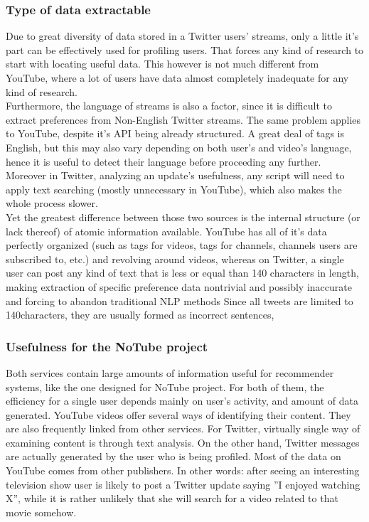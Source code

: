 \subsubsection{Type of data extractable}
Due to great diversity of data stored in a Twitter users' streams, only a little it's part can be effectively used for profiling
users. That forces any kind of research to start with locating useful data. This however is not much different from YouTube, where
a lot of users have data almost completely inadequate for any kind of research.
\\ Furthermore, the language of streams is also a factor, since it is difficult to extract preferences from Non-English Twitter
streams. The same problem applies to YouTube, despite it's API being already structured. A great deal of tags is English,
but this may also vary depending on both user's and video's language, hence it is useful to detect their language before
proceeding any further. Moreover in Twitter, analyzing an update's usefulness, any script will need to apply text searching (mostly
unnecessary in YouTube), which also makes the whole process slower.
\\ Yet the greatest difference between those two sources is the internal structure (or lack thereof) of atomic information
available. YouTube has all of it's data perfectly organized (such as tags for videos, tags for channels, channels users are
subscribed to, etc.) and revolving around videos, whereas on Twitter, a single user can post any kind of text that is
less or equal than 140 characters in length, making extraction of specific preference data nontrivial and possibly inaccurate and forcing to abandon traditional
NLP methods
Since all tweets are limited to 140characters, they are usually formed as incorrect sentences,
\subsubsection{Usefulness for the NoTube project}
Both services contain large amounts of information useful for recommender
systems, like the one designed for NoTube project. For both of them, the
efficiency for a single user depends mainly on user's activity, and amount of
data generated. YouTube videos offer several ways of identifying their content.
They are also frequently linked from other services. For Twitter, virtually single
way of examining content is through text analysis. On the other hand, Twitter
messages are actually generated by the user who is being profiled. Most of the data
on YouTube comes from other publishers. In other words: after seeing an
interesting television show user is likely to post a Twitter update saying ''I
enjoyed watching X'', while it is rather unlikely that she will search for a
video related to that movie somehow.


